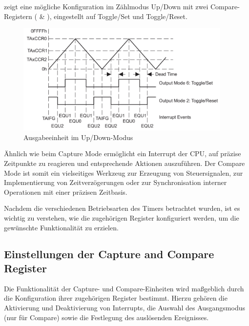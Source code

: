  zeigt eine m\"ogliche Konfiguration im Z\"ahlmodus Up/Down mit zwei Compare-Registern ( \& ), eingestellt auf Toggle/Set und Toggle/Reset.

\begin{figure}[h!]
	\centering
	\includegraphics[width=0.95\textwidth]{../Bilder/UpDown_ModeBsp.png}
	\caption{Ausgabeeinheit im Up/Down-Modus\\}
	\label{fig:OutputUnit_UpDown_Mode}
\end{figure}

\newpage
\"Ahnlich wie beim Capture Mode erm\"oglicht ein Interrupt der CPU, auf pr\"azise Zeitpunkte zu reagieren und entsprechende Aktionen auszuf\"uhren. Der Compare Mode ist somit ein vielseitiges Werkzeug zur Erzeugung von Steuersignalen, zur Implementierung von Zeitverz\"ogerungen oder zur Synchronisation interner Operationen mit einer pr\"azisen Zeitbasis. 

Nachdem die verschiedenen Betriebsarten des Timers betrachtet wurden, ist es wichtig zu verstehen, wie die zugeh\"origen Register konfiguriert werden, um die gew\"unschte Funktionalit\"at zu erzielen.

\subsection{Einstellungen der Capture and Compare Register}
\label{sec:CC_Register}

Die Funktionalit\"at der Capture- und Compare-Einheiten wird ma{\ss}geblich durch die Konfiguration ihrer zugeh\"origen Register bestimmt. Hierzu geh\"oren die Aktivierung und Deaktivierung von Interrupts, die Auswahl des Ausgangsmodus (nur f\"ur Compare) sowie die Festlegung des ausl\"osenden Ereignisses.

